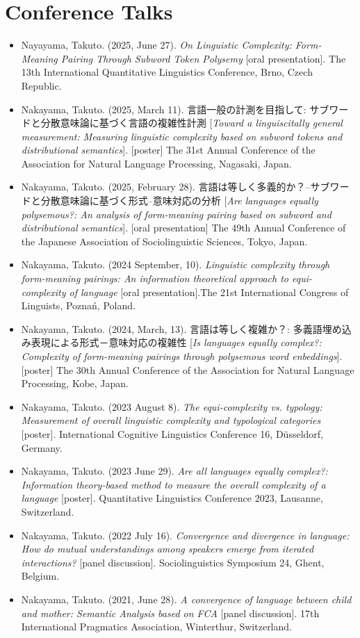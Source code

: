 \documentclass[a4paper,11pt]{article}
\begin{document}
\vspace{1em}

\section*{Conference Talks}
\begin{itemize}[leftmargin=*, itemsep=0em, topsep=0em]
  \item Nayayama, Takuto. (2025, June 27). \textit{On Linguistic Complexity: Form-Meaning Pairing Through Subword Token Polysemy} [oral presentation]. The 13th International Quantitative Linguistics Conference, Brno, Czech Republic.
  \item Nakayama, Takuto. (2025, March 11). 言語一般の計測を目指して: サブワードと分散意味論に基づく言語の複雑性計測 [\textit{Toward a linguiscitally general measurement: Measuring linguistic complexity based on subword tokens and distributional semantics}]. [poster] The 31st Annual Conference of the Association for Natural Language Processing, Nagasaki, Japan.
  \item Nakayama, Takuto. (2025, February 28). 言語は等しく多義的か？–サブワードと分散意味論に基づく形式–意味対応の分析 [\textit{Are languages equally polysemous?: An analysis of form-meaning pairing based on subword and distributional semantics}]. [oral presentation] The 49th Annual Conference of the Japanese Association of Sociolinguistic Sciences, Tokyo, Japan.
  \item Nakayama, Takuto. (2024 September, 10). \textit{Linguistic complexity through form-meaning pairings: An information theoretical approach to equi-complexity of language} [oral presentation].The 21st International Congress of Linguists, Poznań, Poland.
  \item Nakayama, Takuto. (2024, March, 13). 言語は等しく複雑か？: 多義語埋め込み表現による形式－意味対応の複雑性 [\textit{Is languages equally complex?: Complexity of form-meaning pairings through polysemous word enbeddings}]. [poster] The 30th Annual Conference of the Association for Natural Language Processing, Kobe, Japan.
  \item Nakayama, Takuto. (2023 August 8). \textit{The equi-complexity vs. typology: Measurement of overall linguistic complexity and typological categories} [poster]. International Cognitive Linguistics Conference 16, Düsseldorf, Germany.
  \item Nakayama, Takuto. (2023 June 29). \textit{Are all languages equally complex?: Information theory-based method to measure the overall complexity of a language} [poster]. Quantitative Linguistics Conference 2023, Lausanne, Switzerland.
  \item Nakayama, Takuto. (2022 July 16). \textit{Convergence and divergence in language: How do mutual understandings among speakers emerge from iterated interactions?} [panel discussion]. Sociolinguistics Symposium 24, Ghent, Belgium.
  \item Nakayama, Takuto. (2021, June 28). \textit{A convergence of language between child and mother: Semantic Analysis based on FCA} [panel discussion]. 17th International Pragmatics Association, Winterthur, Switzerland.
\end{itemize}
\end{document}
